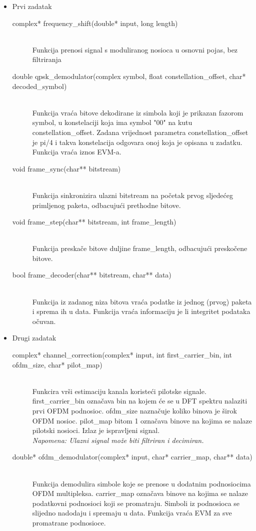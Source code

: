 \documentclass[a4paper]{article}
\begin{document}
\begin{itemize}
\item Prvi zadatak
	\begin{description}
	\item[complex* frequency\_shift(double* input, long length)]
	\,\\ Funkcija prenosi signal s moduliranog nosioca u osnovni pojas, bez filtriranja
	\item[double qpsk\_demodulator(complex symbol, float constellation\_offset, char* decoded\_symbol)]
	\,\\ Funkcija vraća bitove dekodirane iz simbola koji je prikazan fazorom symbol, u konstelaciji koja ima symbol "00" na kutu constellation\_offset. Zadana vrijednost parametra constellation\_offset je pi/4 i takva konstelacija odgovara onoj koja je opisana u zadatku. Funkcija vraća iznos EVM-a.
	\item[void frame\_sync(char** bitstream)]
	\,\\ Funkcija sinkronizira ulazni bitstream na početak prvog sljedećeg primljenog paketa, odbacujući prethodne bitove.
	\item[void frame\_step(char** bitstream, int frame\_length)]
	\,\\ Funkcija preskače bitove duljine frame\_length, odbacujući preskočene bitove.
	\item[bool frame\_decoder(char** bitstream, char** data)]
	\,\\ Funkcija iz zadanog niza bitova vraća podatke iz jednog (prvog) paketa i sprema ih u data. Funkcija vraća informaciju je li integritet podataka očuvan.
	\end{description}
\item Drugi zadatak
	\begin{description}
	\item[complex* channel\_correction(complex* input, int first\_carrier\_bin, int ofdm\_size, char* pilot\_map)]
	\,\\ Funkcira vrši estimaciju kanala koristeći pilotske signale. first\_carrier\_bin označava bin na kojem će se u DFT spektru nalaziti prvi OFDM podnosioc. ofdm\_size naznačuje koliko binova je širok OFDM nosioc. pilot\_map bitom 1 označava binove na kojima se nalaze pilotski nosioci. Izlaz je ispravljeni signal.
	\\ \textit{Napomena: Ulazni signal može biti filtriran i decimiran.}
	\item[double* ofdm\_demodulator(complex* input, char* carrier\_map, char** data)]
	\,\\ Funkcija demodulira simbole koje se prenose u dodatnim podnosiocima OFDM multipleksa. carrier\_map označava binove na kojima se nalaze podatkovni podnosioci koji se promatraju. Simboli iz podnosioca se slijedno nadodaju i spremaju u data. Funkcija vraća EVM za sve promatrane podnosioce.
	\end{description}
\end{itemize}
\end{document}
